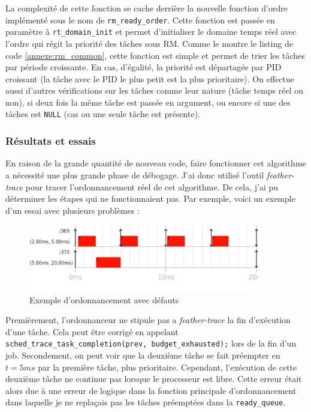 La complexité de cette fonction se cache derrière la nouvelle fonction d'ordre implémenté sous le nom de \texttt{rm\_ready\_order}. Cette fonction est passée en paramètre à \texttt{rt\_domain\_init} et permet d'initialiser le domaine temps réel avec l'ordre qui régit la priorité des tâches sous RM. Comme le montre le listing de code \ref{annexe:rm_common}, cette fonction est simple et permet de trier les tâches par période croissante. En cas, d'égalité, la priorité est départagée par PID croissant (la tâche avec le PID le plus petit est la plus prioritaire). On effectue aussi d'autres vérifications sur les tâches comme leur nature (tâche temps réel ou non), si deux fois la même tâche est passée en argument, ou encore si une des tâches est \texttt{NULL} (cas ou une seule tâche est présente).

\subsubsection{Résultats et essais}

En raison de la grande quantité de nouveau code, faire fonctionner cet algorithme a nécessité une plus grande phase de débogage. J'ai donc utilisé l'outil \textit{feather-trace} pour tracer l'ordonnancement réel de cet algorithme. De cela, j'ai pu déterminer les étapes qui ne fonctionnaient pas. Par exemple, voici un exemple d'un essai avec plusieurs problèmes : 
\begin{figure}[H]
    \centering
    \includegraphics[width=0.9\textwidth]{Images/schedule_host=rock960_scheduler=DEMO_trace=notstoped.png}
    \caption{Exemple d'ordonnancement avec défauts}
\end{figure}

Premièrement, l'ordonnanceur ne stipule pas a \textit{feather-trace} la fin d'exécution d'une tâche. Cela peut être corrigé en  appelant \texttt{sched\_trace\_task\_completion(prev, budget\_exhausted);} lors de la fin d'un job.
Secondement, on peut voir que la deuxième tâche se fait préempter en $t=5ms$ par la première tâche, plus prioritaire. Cependant, l'exécution de cette deuxième tâche ne continue pas lorsque le processeur est libre. Cette erreur était alors due à une erreur de logique dans la fonction principale d'ordonnancement dans laquelle je ne replaçais pas les tâches préemptées dans la \texttt{ready\_queue}.

